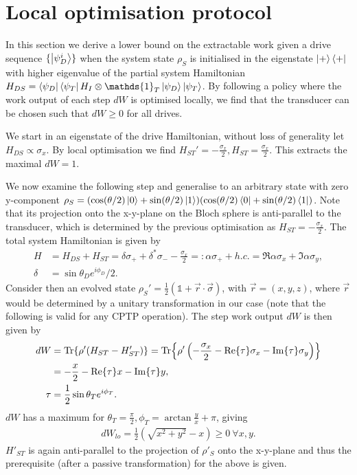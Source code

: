 \section{Local optimisation protocol}
In this section we derive a lower bound on the extractable work given a drive sequence $\{\ket{\psi_D^i}\}$ when the system state $\rho_S$ is initialised in the eigenstate $\ket{+}\bra{+}$ with higher eigenvalue of the partial system Hamiltonian $H_{DS} = \bra{\psi_D}\bra{\psi_T} H_I \otimes \mathds{1}_T \ket{\psi_D} \ket{\psi_T}$.
By following a policy where the work output of each step $dW$ is optimised locally, we find that the transducer can be chosen such that $dW \geq 0$ for all drives.

We start in an eigenstate of the drive Hamiltonian, without loss of generality let $H_{DS} \propto \sigma_x$.
By local optimisation we find $H_{ST}' = -\frac{\sigma_x}{2}, H_{ST} = \frac{\sigma_x}{2}$.
This extracts the maximal $dW = 1$.

We now examine the following step and generalise to an arbitrary state with zero y-component $\rho_S = (\cos(\theta/2) \ket{0} + \sin(\theta/2) \ket{1})(\cos(\theta/2) \bra{0} + \sin(\theta/2) \bra{1})$.
Note that its projection onto the x-y-plane on the Bloch sphere is anti-parallel to the transducer, which is determined by the previous optimisation as $H_{ST} = -\frac{\sigma_x}{2}$.
The total system Hamiltonian is given by
\begin{align*}
H &= H_{DS} + H_{ST} =  \delta \sigma_+ + \delta^* \sigma_{-} - \frac{\sigma_x}{2} =: \alpha \sigma_+ + h.c. = \Re{\alpha} \sigma_x + \Im{\alpha} \sigma_y, \\
\delta &= \sin{\theta_D} e^{i\phi_D} / 2.
\end{align*}
Consider then an evolved state $\rho_S' =\frac{1}{2} (\mathds{1} + \vec{r} \cdot \vec{\sigma})$, with $\vec{r} = ( x, y, z )$, where $\vec{r}$ would be determined by a unitary transformation in our case (note that the following is valid for any CPTP operation). The step work output $dW$ is then given by
\begin{align*}
dW &= \Tr{\rho' (H_{ST} - H'_{ST})} = \Tr{\rho' \left(-\frac{\sigma_x}{2} - \Re{\tau} \sigma_x - \Im{\tau} \sigma_y \right)} \\
&= -\frac{x}{2} - \Re{\tau} x - \Im{\tau} y, \\
\tau &= \frac{1}{2} \sin{\theta_T} e^{i\phi_T}. 
\end{align*}
$dW$ has a maximum for $\theta_T = \frac{\pi}{2}, \phi_T = \arctan{\frac{y}{x}} + \pi$, giving
\begin{align*}
dW_{lo} = \frac{1}{2}\left(\sqrt{x^2 + y^2} -x\right) \geq 0 \ \forall x, y.
\end{align*}
$H'_{ST}$ is again anti-parallel to the projection of $\rho'_S$ onto the x-y-plane and thus the prerequisite (after a passive transformation) for the above is given.

